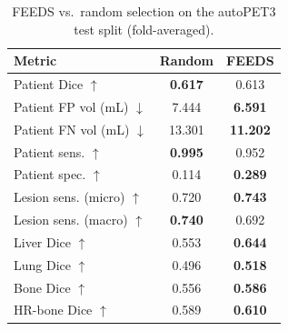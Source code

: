 \begin{table}[t]
\centering
\caption{FEEDS vs.\ random selection on the autoPET3 test split (fold-averaged).}
\label{tab:summary_extended}
\begin{tabular}{lcc}
\toprule
Metric & Random & FEEDS \\
\midrule
Patient Dice $\uparrow$ & \textbf{0.617} & 0.613 \\
Patient FP vol (mL) $\downarrow$ & 7.444 & \textbf{6.591} \\
Patient FN vol (mL) $\downarrow$ & 13.301 & \textbf{11.202} \\
Patient sens. $\uparrow$ & \textbf{0.995} & 0.952 \\
Patient spec. $\uparrow$ & 0.114 & \textbf{0.289} \\
Lesion sens. (micro) $\uparrow$ & 0.720 & \textbf{0.743} \\
Lesion sens. (macro) $\uparrow$ & \textbf{0.740} & 0.692 \\
Liver Dice $\uparrow$ & 0.553 & \textbf{0.644} \\
Lung Dice $\uparrow$ & 0.496 & \textbf{0.518} \\
Bone Dice $\uparrow$ & 0.556 & \textbf{0.586} \\
HR-bone Dice $\uparrow$ & 0.589 & \textbf{0.610} \\
\bottomrule
\end{tabular}
\end{table}